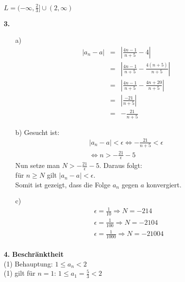 \documentclass [a4paper,11pt]{article}
\begin{document}
\begin{enumerate}
            $L = (- \infty, \frac{2}{3}] \cup (2, \infty)$
        \item[\textbf{3.}]
            \begin{enumerate}
                \item[a)]
                    \begin{align}
                        |a_n - a| &=& |\frac{4n-1}{n+5} - 4| \\
                        &=& |\frac{4n-1}{n+5} - \frac{4(n+5)}{n+5}| \\
                        &=& |\frac{4n-1}{n+5} - \frac{4n+20}{n+5}| \\
                        &=& |\frac{-21}{n+5}| \\
                        &=& - \frac{21}{n+5}
                    \end{align}
                \item[b)]
                    Gesucht ist:
                    \begin{align}
                        |a_n - a| < \epsilon \Leftrightarrow - \frac{21}{n+5} < \epsilon \\
                        \Leftrightarrow n > - \frac{21}{\epsilon} -5
                    \end{align}
                    Nun setze man $N > - \frac{21}{\epsilon} -5$. Daraus folgt: \\
                    für $n \geq N$ gilt $|a_n - a| < \epsilon$. \\
                    Somit ist gezeigt, dass die Folge $a_n$ gegen $a$ konvergiert.
                \item[c)]
                    \begin{align}
                        & \epsilon = \frac{1}{10} \Rightarrow N = -214 \\
                        & \epsilon = \frac{1}{100} \Rightarrow N = -2104 \\
                        & \epsilon = \frac{1}{1000} \Rightarrow N = -21004 \\
                    \end{align}
            \end{enumerate}
        \item[\textbf{4.}]
            \textbf{Beschränktheit}\\
                (1) Behauptung: $1 \leq a_n < 2$ \\
                (1) gilt für $n=1$: $1 \leq a_1= \frac{5}{3} < 2$ \\

\end{enumerate}
\end{document}
